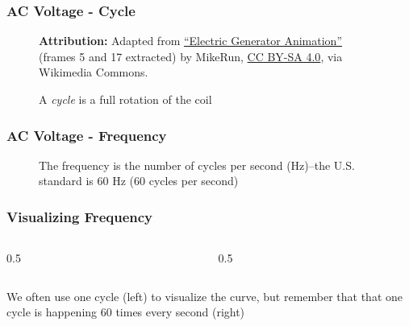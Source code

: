 \begin{frame}
    \frametitle{AC Voltage - Cycle}

    \begin{figure}
        \centering
        \resizebox{0.5\linewidth}{!}{
            
        }

        {\tiny \textbf{Attribution:} Adapted from \href{https://commons.wikimedia.org/wiki/File:Electric-generator-animation.gif}{``Electric Generator Animation''} (frames 5 and 17 extracted) by MikeRun, \href{https://creativecommons.org/licenses/by-sa/4.0}{CC BY-SA 4.0}, via Wikimedia Commons.\\[0.5em]}

        {\footnotesize A \emph{cycle} is a full rotation of the coil\par}

    \end{figure}

\end{frame}

\begin{frame}
    \frametitle{AC Voltage - Frequency}

    \begin{figure}
        \centering
        \resizebox{0.75\linewidth}{!}{
            
        }

        {\footnotesize The frequency is the number of cycles per second (Hz)--the U.S. standard is 60 Hz (60 cycles per second)\par}

    \end{figure}

\end{frame}

\begin{frame}
    \frametitle{Visualizing Frequency}
    \begin{columns}
        \begin{column}{0.5\linewidth}
            \begin{figure}
                \centering
                \resizebox{\columnwidth}{!}{
                    
                }
            \end{figure}
        \end{column}
        \begin{column}{0.5\linewidth}
            \begin{figure}
                \centering
                \resizebox{\columnwidth}{!}{
                    
                }
            \end{figure}
        \end{column}
    \end{columns}
    \centering
    {\footnotesize We often use one cycle (left) to visualize the curve, but remember that that one cycle is happening 60 times every second (right)\par}
\end{frame}

